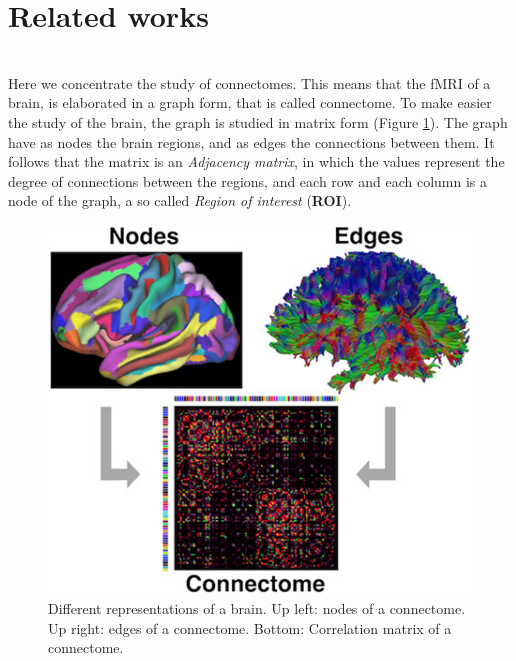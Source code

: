 \section{Related works}\
\\
Here we concentrate the study of connectomes. This means that the fMRI of a brain, is elaborated in a graph form, that is called connectome. To make easier the study of the brain, the graph is studied in matrix form (Figure \ref{fig:diagram4}). The graph have as nodes the brain regions, and as edges the connections between them. It follows that the matrix is an \emph{Adjacency matrix}, in which the values represent the degree of connections between the regions, and each row and each column is a node of the graph, a so called \emph{Region of interest} (\textbf{ROI}).
\begin{figure}[htbp]
	\centering
	\includegraphics[scale=0.8]{Immagini/nbm3752-toc-0001-m.jpg}
	\caption{Different representations of a brain. Up left: nodes of a connectome. Up right: edges of a connectome. Bottom: Correlation matrix of a connectome.}
	\label{fig:diagram4}
\end{figure}

